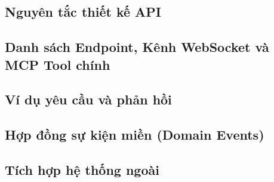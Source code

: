 


\subsection{Nguyên tắc thiết kế API}

\subsection{Danh sách Endpoint, Kênh WebSocket và MCP Tool chính}

\subsection{Ví dụ yêu cầu và phản hồi}

\subsection{Hợp đồng sự kiện miền (Domain Events)}

\subsection{Tích hợp hệ thống ngoài}
